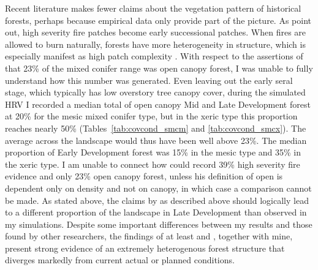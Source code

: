 Recent literature makes fewer claims about the vegetation pattern of historical forests, perhaps because empirical data only provide part of the picture. As \citet{Collins2010} point out, high severity fire patches become early successional patches. When fires are allowed to burn naturally, forests have more heterogeneity in structure, which is especially manifest as high patch complexity \citep{Collins2010}. With respect to the assertions of \citep{Baker2014} that 23\% of the mixed conifer range was open canopy forest, I was unable to fully understand how this number was generated. Even leaving out the early seral stage, which typically has low overstory tree canopy cover, during the simulated HRV I recorded a median total of open canopy Mid and Late Development forest at 20\% for the mesic mixed conifer type, but in the xeric type this proportion reaches nearly 50\% (Tables~\ref{tab:covcond_smcm} and \ref{tab:covcond_smcx}). The average across the landscape would thus have been well above 23\%. The median proportion of Early Development forest was 15\% in the mesic type and 35\% in the xeric type. I am unable to connect how \citet{Baker2014} could record 39\% high severity fire evidence and only 23\% open canopy forest, unless his definition of open is dependent only on density and not on canopy, in which case a comparison cannot be made. As stated above, the claims by \citet{Mallek2013} as described above should logically lead to a different proportion of the landscape in Late Development than observed in my simulations. Despite some important differences between my results and those found by other researchers, the findings of at least \citet{Baker2012} and \citet{Collins2010}, together with mine, present strong evidence of an extremely heterogenous forest structure that diverges markedly from current actual or planned conditions. 

